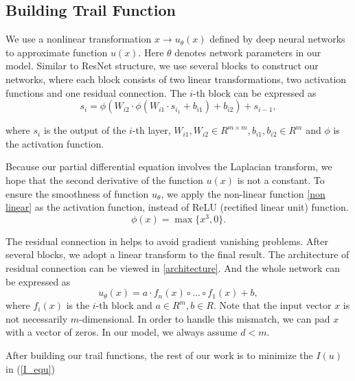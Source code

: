 \documentclass{article}
\begin{document}
\subsection{Building Trail Function}
\par We use a nonlinear transformation $x \to u_{\theta}(x)$ defined by deep neural networks to approximate function $u(x)$. Here $\theta$ denotes network parameters in our model. Similar to ResNet structure, we use several blocks to construct our networks, where each block consists of two linear transformations, two activation functions and one residual connection. The $i$-th block can be expressed as 
\begin{equation}\label{res_equ}
	s_i=\phi(W_{i2}\cdot\phi(W_{i1}\cdot s_{i_1}+b_{i1})+b_{i2})+s_{i-1},
\end{equation}

where $s_{i}$ is the output of the $i$-th layer, $W_{i1},W_{i2}\in R^{m\times m},b_{i1},b_{i2}\in R^{m}$ and $\phi$ is the activation function.



\par Because our partial differential equation involves the Laplacian transform, we hope that the second derivative of the function $u(x)$ is not a constant. To ensure the smoothness of function $u_{\theta}$, we apply the non-linear function \eqref{non linear} as the activation function, instead of ReLU (rectified linear unit) function.
\begin{equation}\label{non linear}
	\phi(x)=\max\{x^3,0\}. 
\end{equation}

\par The residual connection in \cite{he2016deep} helps to avoid gradient vanishing problems. After several blocks, we adopt a linear transform to the final result. The architecture of residual connection can be viewed in \ref{architecture}. And the whole network can be expressed as
\begin{equation}
	u_{\theta}(x)=a\cdot f_n(x) \circ ...\circ f_1(x)+b,
\end{equation}
where $f_i(x)$ is the $i$-th block and $a\in R^m, b\in R$. Note that the input vector $x$ is not necessarily $m$-dimensional. In order to handle this mismatch, we can pad $x$ with a vector of zeros. In our model, we always assume $d<m$.
\par After building our trail functions, the rest of our work is to minimize the $I(u)$ in (\ref{I_equ})
\end{document}

